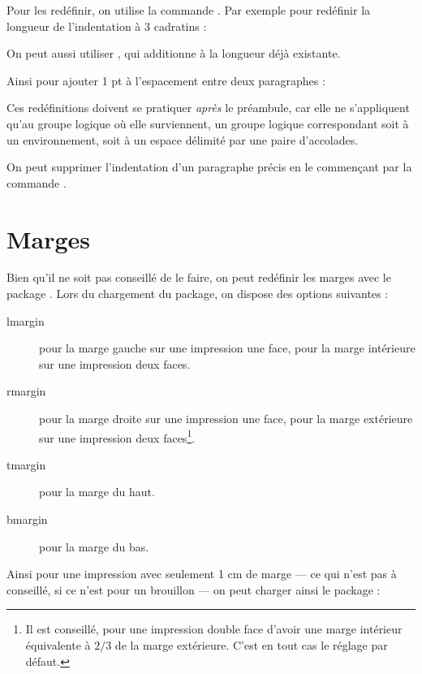 Pour les redéfinir, on utilise la commande . Par exemple pour redéfinir la longueur de l'indentation à 3 cadratins :
\begin{latexcode}
\setlength{\parindent}{3ex}
\end{latexcode}

On peut aussi utiliser , qui additionne  à la longueur déjà existante.

Ainsi pour ajouter 1 pt à l'espacement entre deux paragraphes :

\begin{latexcode}
\addtolength{\parskip}{1pt}
\end{latexcode}

Ces redéfinitions doivent se pratiquer \emph{après} le préambule, car elle ne s'appliquent qu'au groupe logique où elle surviennent, un groupe logique correspondant soit à un environnement, soit à un espace délimité par une paire d'accolades.

\begin{plusloins}
On peut supprimer l'indentation d'un paragraphe précis en le commençant par la commande .
\end{plusloins}

\section{Marges}

Bien qu'il ne soit pas conseillé de le faire, on peut redéfinir les marges avec le package . Lors du chargement du package, on dispose des options suivantes :
\begin{description}
\item[lmargin]pour la marge gauche sur une impression une face, pour la marge intérieure sur une impression deux faces.
\item[rmargin]pour la marge droite sur une impression une face, pour la marge extérieure sur une impression deux faces\footnote{Il est conseillé, pour une impression double face d'avoir une marge intérieur équivalente à $2/3$ de la marge extérieure. C'est en tout cas le réglage par défaut.}.
\item[tmargin]pour la marge du haut.
\item[bmargin]pour la marge du bas.
\end{description}

Ainsi pour une impression avec seulement 1 cm de marge --- ce qui n'est pas à conseillé, si ce n'est pour un brouillon --- on peut charger ainsi le package :

